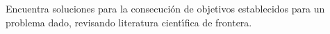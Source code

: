 Encuentra soluciones para la consecuci\'{o}n de objetivos establecidos
para un problema dado, revisando literatura cient\'{\i}fica de
frontera.
